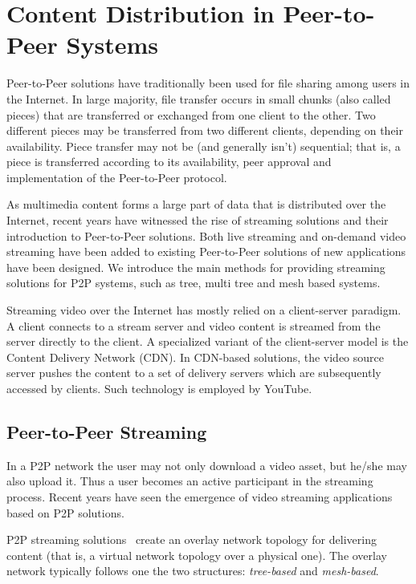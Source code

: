 \section{Content Distribution in Peer-to-Peer Systems}
\label{sec:p2p-systems:streaming}

Peer-to-Peer solutions have traditionally been used for file sharing among
users in the Internet. In large majority, file transfer occurs in small
chunks (also called pieces) that are transferred or exchanged from one client
to the other. Two different pieces may be transferred from two different
clients, depending on their availability. Piece transfer may not be (and
generally isn't) sequential; that is, a piece is transferred according to its
availability, peer approval and implementation of the Peer-to-Peer protocol.

As multimedia content forms a large part of data that is distributed over the
Internet, recent years have witnessed the rise of streaming solutions and
their introduction to Peer-to-Peer solutions. Both live streaming and
on-demand video streaming have been added to existing Peer-to-Peer solutions
of new applications have been designed. We introduce the main methods for
providing streaming solutions for P2P systems, such as tree, multi tree and
mesh based systems.

Streaming video over the Internet has mostly relied on a client-server
paradigm. A client connects to a stream server and video content is streamed
from the server directly to the client. A specialized variant of the
client-server model is the Content Delivery Network (CDN). In CDN-based
solutions, the video source server pushes the content to a set of delivery
servers which are subsequently accessed by clients. Such technology is
employed by YouTube.

\subsection{Peer-to-Peer Streaming}
\label{subsec:p2p-systems:p2p-streaming-p2p}

In a P2P network the user may not only download a video asset, but he/she may
also upload it. Thus a user becomes an active participant in the streaming
process. Recent years have seen the emergence of video streaming applications
based on P2P solutions.

P2P streaming solutions~\cite{p2p-streaming-survey} create an overlay network topology for
delivering content (that is, a virtual network topology over a physical one).
The overlay network typically follows one the two structures:
\textit{tree-based} and \textit{mesh-based}.

